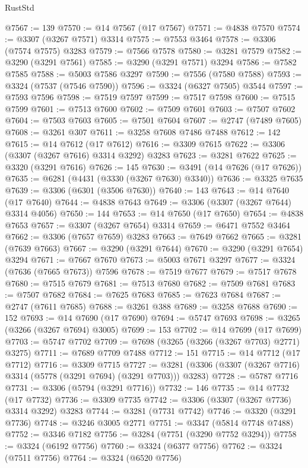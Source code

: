 \begin{lexlean}{RustStd}
\begin{coremodule}
@7567 := 139
@7570 := @14 @7567 (@17 @7567)
@7571 := @4838 @7570
@7574 := @3307 (@3267 @7571) @3314
@7575 := @7553 @3464
@7578 := @3306 (@7574 @7575) @3283
@7579 := @7566 @7578
@7580 := @3281 @7579
@7582 := @3290 (@3291 @7561)
@7585 := @3290 (@3291 @7571) @3294
@7586 := @7582 @7585
@7588 := @5003 @7586 @3297
@7590 := @7556 (@7580 @7588)
@7593 := @3324 (@7537 (@7546 @7590))
@7596 := @3324 (@6327 @7505) @3544
@7597 := @7593 @7596
@7598 := @7519 @7597
@7599 := @7517 @7598
@7600 := @7515 @7599
@7601 := @7513 @7600
@7602 := @7509 @7601
@7603 := @7507 @7602
@7604 := @7503 @7603
@7605 := @7501 @7604
@7607 := @2747 (@7489 @7605)
@7608 := @3261 @307
@7611 := @3258 @7608 @7486 @7488
@7612 := 142
@7615 := @14 @7612 (@17 @7612)
@7616 := @3309 @7615
@7622 := @3306 (@3307 (@3267 @7616) @3314 @3292) @3283
@7623 := @3281 @7622
@7625 := @3320 (@3291 @7616)
@7626 := 145
@7630 := @3491 (@14 @7626 (@17 @7626))
@7635 := @6281 (@4431 (@3330 (@3267 @7630) @3340))
@7636 := @3325 @7635
@7639 := @3306 (@6301 (@3506 @7630))
@7640 := 143
@7643 := @14 @7640 (@17 @7640)
@7644 := @4838 @7643
@7649 := @3306 (@3307 (@3267 @7644) @3314 @4056)
@7650 := 144
@7653 := @14 @7650 (@17 @7650)
@7654 := @4838 @7653
@7657 := @3307 (@3267 @7654) @3314
@7659 := @6471 @7552 @3464
@7662 := @3306 (@7657 @7659) @3283
@7663 := @7649 @7662
@7665 := @3281 (@7639 @7663)
@7667 := @3290 (@3291 @7644)
@7670 := @3290 (@3291 @7654) @3294
@7671 := @7667 @7670
@7673 := @5003 @7671 @3297
@7677 := @3324 (@7636 (@7665 @7673)) @7596
@7678 := @7519 @7677
@7679 := @7517 @7678
@7680 := @7515 @7679
@7681 := @7513 @7680
@7682 := @7509 @7681
@7683 := @7507 @7682
@7684 := @7625 @7683
@7685 := @7623 @7684
@7687 := @2747 (@7611 @7685)
@7688 := @3261 @388
@7689 := @3258 @7688
@7690 := 152
@7693 := @14 @7690 (@17 @7690)
@7694 := @5747 @7693
@7698 := @3265 (@3266 (@3267 @7694) @3005)
@7699 := 153
@7702 := @14 @7699 (@17 @7699)
@7703 := @5747 @7702
@7709 := @7698 (@3265 (@3266 (@3267 @7703) @2771) @3275)
@7711 := @7689 @7709 @7488
@7712 := 151
@7715 := @14 @7712 (@17 @7712)
@7716 := @3309 @7715
@7727 := @3281 (@3306 (@3307 (@3267 @7716) @3314 (@5778 (@3291 @7694) (@3291 @7703))) @3283)
@7728 := @5787 @7716
@7731 := @3306 (@5794 (@3291 @7716))
@7732 := 146
@7735 := @14 @7732 (@17 @7732)
@7736 := @3309 @7735
@7742 := @3306 (@3307 (@3267 @7736) @3314 @3292) @3283
@7744 := @3281 (@7731 @7742)
@7746 := @3320 (@3291 @7736)
@7748 := @3246 @3005 @2771
@7751 := @3347 (@5814 @7748 @7488)
@7752 := @3346 @7182
@7756 := @3284 (@7751 (@3290 @7752 @3294))
@7758 := @3324 (@6192 @7756)
@7760 := @3324 (@6377 @7756)
@7762 := @3324 (@7511 @7756)
@7764 := @3324 (@6520 @7756)

\end{coremodule}
\end{lexlean}
